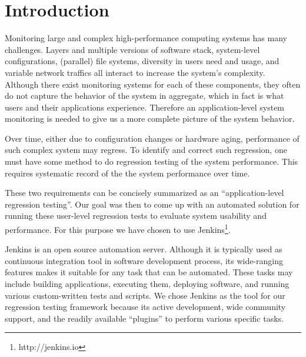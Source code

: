 \documentclass[10pt, conference, compsocconf]{IEEEtran}
\begin{document}
%
\IEEEpeerreviewmaketitle

\section{Introduction}
\label{sec:introduction}

Monitoring large and complex high-performance computing systems has many challenges. Layers and multiple versions of software stack, system-level configurations, (parallel) file systems, diversity in users need and usage, and variable network traffics all interact to increase the system's complexity. Although there exist monitoring systems for each of these components, they often do not capture the behavior of the system in aggregate, which in fact is what users and their applications experience. Therefore an application-level system monitoring is needed to give us a more complete picture of the system behavior.  

Over time, either due to configuration changes or hardware aging, performance of such complex system may regress. To identify and correct such regression, one must have some method to do regression testing of the system performance. This requires systematic record of the the system performance over time.

These two requirements can be concisely summarized as an ``application-level regression testing''. Our goal was then to come up with an automated solution for running these user-level regression tests to evaluate system usability and performance. For this purpose we have chosen to use Jenkins\footnote{http://jenkins.io}.

Jenkins is an open source automation server. Although it is typically used as continuous integration tool in software development process, its wide-ranging features makes it suitable for any task that can be automated. These tasks may include building applications, executing them, deploying software, and running various custom-written tests and scripts. We chose Jenkins as the tool for our regression testing framework because its active development, wide community support, and the readily available ``plugins'' to perform various specific tasks.
\end{document}
